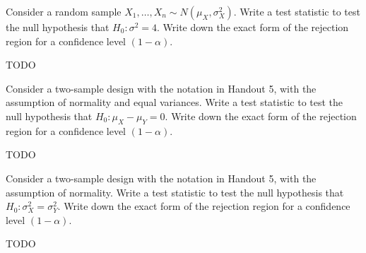 
Consider a random sample $X_1, \ldots, X_n \sim N(\mu_X, \sigma^2_X)$. 
Write a test statistic to test the null hypothesis that $H_0: \sigma^2 = 4$.
Write down the exact form of the rejection region for a confidence level 
$(1 - \alpha)$.


TODO


Consider a two-sample design with the notation in Handout 5, with the assumption
of normality and equal variances. Write a test statistic to test the null
hypothesis that $H_0: \mu_X - \mu_Y = 0$. Write down the exact form of the
rejection region for a confidence level  $(1 - \alpha)$.


TODO


Consider a two-sample design with the notation in Handout 5, with the assumption
of normality. Write a test statistic to test the null
hypothesis that $H_0: \sigma_X^2 = \sigma_Y^2$. Write down the exact form of the
rejection region for a confidence level  $(1 - \alpha)$.


TODO
